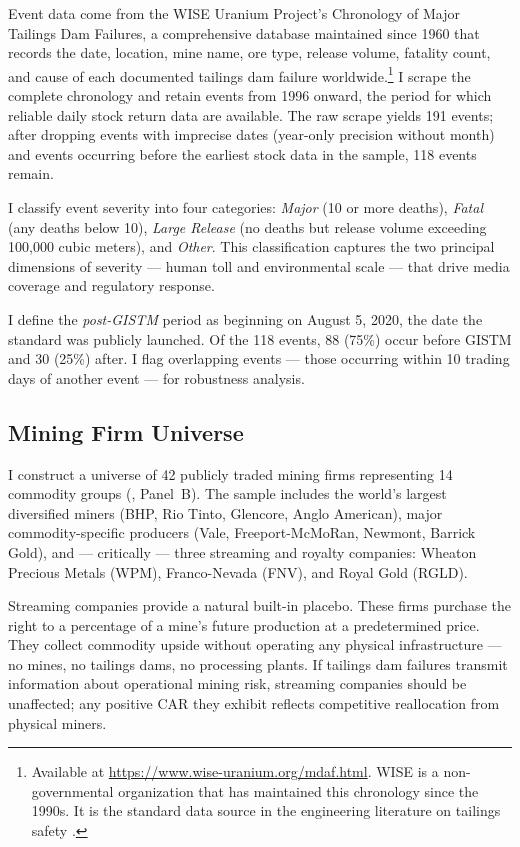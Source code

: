 \documentclass[12pt]{article}
\begin{document}
Event data come from the WISE Uranium Project's Chronology of Major Tailings Dam Failures, a comprehensive database maintained since 1960 that records the date, location, mine name, ore type, release volume, fatality count, and cause of each documented tailings dam failure worldwide.\footnote{Available at \url{https://www.wise-uranium.org/mdaf.html}. WISE is a non-governmental organization that has maintained this chronology since the 1990s. It is the standard data source in the engineering literature on tailings safety \citep{rico2008reported, bowker2015global}.} I scrape the complete chronology and retain events from 1996 onward, the period for which reliable daily stock return data are available. The raw scrape yields 191 events; after dropping events with imprecise dates (year-only precision without month) and events occurring before the earliest stock data in the sample, 118 events remain.

I classify event severity into four categories: \textit{Major} (10 or more deaths), \textit{Fatal} (any deaths below 10), \textit{Large Release} (no deaths but release volume exceeding 100,000 cubic meters), and \textit{Other}. This classification captures the two principal dimensions of severity --- human toll and environmental scale --- that drive media coverage and regulatory response.

I define the \textit{post-GISTM} period as beginning on August 5, 2020, the date the standard was publicly launched. Of the 118 events, 88 (75\%) occur before GISTM and 30 (25\%) after. I flag overlapping events --- those occurring within 10 trading days of another event --- for robustness analysis.

\subsection{Mining Firm Universe}

I construct a universe of 42 publicly traded mining firms representing 14 commodity groups (, Panel~B). The sample includes the world's largest diversified miners (BHP, Rio Tinto, Glencore, Anglo American), major commodity-specific producers (Vale, Freeport-McMoRan, Newmont, Barrick Gold), and --- critically --- three streaming and royalty companies: Wheaton Precious Metals (WPM), Franco-Nevada (FNV), and Royal Gold (RGLD).

Streaming companies provide a natural built-in placebo. These firms purchase the right to a percentage of a mine's future production at a predetermined price. They collect commodity upside without operating any physical infrastructure --- no mines, no tailings dams, no processing plants. If tailings dam failures transmit information about operational mining risk, streaming companies should be unaffected; any positive CAR they exhibit reflects competitive reallocation from physical miners.
\end{document}
